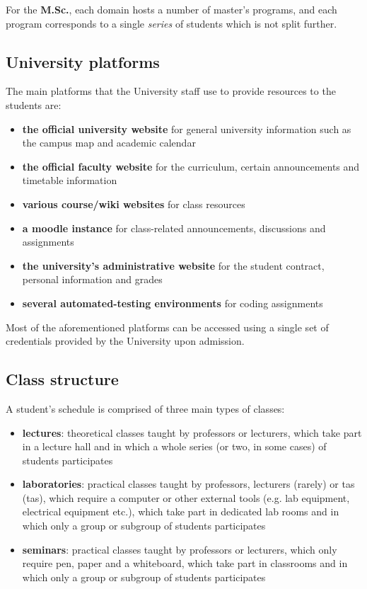         For the \textbf{M.Sc.}, each domain hosts a number of master's programs, and each program corresponds to a single \textit{series} of students which is not split further.
    
    \subsection{University platforms} \label{1:university_platforms}
    
        The main platforms that the University staff use to provide resources to the students are:
        
        \begin{itemize}
            \item \textbf{the official university website} for general university information such as the campus map and academic calendar
            \item \textbf{the official faculty website} for the curriculum, certain announcements and timetable information
            \item \textbf{various course/wiki websites} for class resources
            \item \textbf{a \gls{moodle} instance} for class-related announcements, discussions and assignments
            \item \textbf{the university's administrative website} for the student contract, personal information and grades
            \item \textbf{several automated-testing environments} for coding assignments
        \end{itemize}
    
        Most of the aforementioned platforms can be accessed using a single set of credentials provided by the University upon admission.
        
    \subsection{Class structure} \label{1:class_structure}
    
    A student's schedule is comprised of three main types of classes:
    
    \begin{itemize}
        \item \textbf{lectures}: theoretical classes taught by professors or lecturers, which take part in a lecture hall and in which a whole series (or two, in some cases) of students participates
        \item \textbf{laboratories}: practical classes taught by professors, lecturers (rarely) or \acrshort{ta}s (\acrlong{ta}s), which require a computer or other external tools (e.g. lab equipment, electrical equipment etc.), which take part in dedicated lab rooms and in which only a group or subgroup of students participates
        \item \textbf{seminars}: practical classes taught by professors or lecturers, which only require pen, paper and a whiteboard, which take part in classrooms and in which only a group or subgroup of students participates
    \end{itemize}
    
